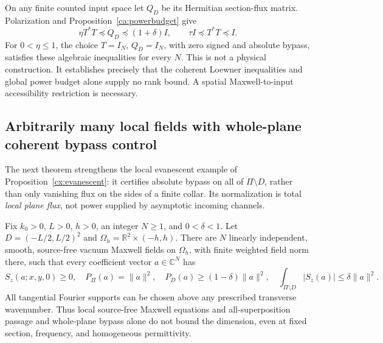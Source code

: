 \begin{remark}
\label{ca:loewner}
On any finite counted input space let $Q_D$ be its Hermitian section-flux
matrix.  Polarization and Proposition~\ref{ca:powerbudget} give
\begin{equation}
 \eta T^*T\preceq Q_D\preceq(1+\delta)I,
 \qquad \tau I\preceq T^*T\preceq I.
 \label{ca:loewnereq}
\end{equation}
For $0<\eta\leq1$, the choice $T=I_N$, $Q_D=I_N$, with zero signed and
absolute bypass, satisfies these algebraic inequalities for every $N$.
This is not a physical construction.  It establishes precisely that the
coherent Loewner inequalities and global power budget alone supply no rank
bound.  A spatial Maxwell-to-input accessibility restriction is necessary.
\end{remark}

\subsection{Arbitrarily many local fields with whole-plane coherent bypass control}

The next theorem strengthens the local evanescent example of
Proposition~\ref{cx:evanescent}: it certifies absolute bypass on all of
$\Pi\setminus D$, rather than only vanishing flux on the sides of a
finite collar.  Its normalization is total \emph{local plane flux}, not
power supplied by asymptotic incoming channels.

\begin{theorem}
\label{ca:localpackets}
Fix $k_0>0$, $L>0$, $h>0$, an integer $N\geq1$, and $0<\delta<1$.
Let $D=(-L/2,L/2)^2$ and
$\Omega_h=\mathbb R^2\times(-h,h)$.  There are $N$ linearly independent,
smooth, source-free vacuum Maxwell fields on $\Omega_h$, with finite
weighted field norm there, such that every coefficient vector
$a\in\mathbb C^N$ has
\begin{equation}
 S_z(a;x,y,0)\geq0,\quad
 P_\Pi(a)=\|a\|^2,\quad
 P_D(a)\geq(1-\delta)\|a\|^2,\quad
 \int_{\Pi\setminus D}|S_z(a)|\leq\delta\|a\|^2.
 \label{ca:packetflux}
\end{equation}
All tangential Fourier supports can be chosen above any prescribed
transverse wavenumber.  Thus local source-free Maxwell equations and
all-superposition passage and whole-plane bypass alone do not bound the
dimension, even at fixed section, frequency, and homogeneous permittivity.
\end{theorem}


